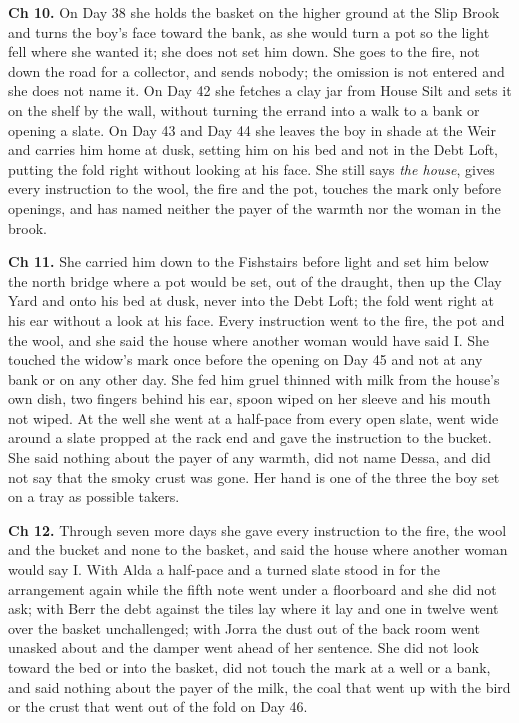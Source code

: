 \documentclass{design/chronicle}
\begin{document}
{\textbf{Ch 10.} On Day 38 she holds the basket on the higher ground at the Slip Brook and turns the boy’s face toward the bank, as she would turn a pot so the light fell where she wanted it; she does not set him down. She goes to the fire, not down the road for a collector, and sends nobody; the omission is not entered and she does not name it. On Day 42 she fetches a clay jar from House Silt and sets it on the shelf by the wall, without turning the errand into a walk to a bank or opening a slate. On Day 43 and Day 44 she leaves the boy in shade at the Weir and carries him home at dusk, setting him on his bed and not in the Debt Loft, putting the fold right without looking at his face. She still says \emph{the house}, gives every instruction to the wool, the fire and the pot, touches the mark only before openings, and has named neither the payer of the warmth nor the woman in the brook.

\textbf{Ch 11.} She carried him down to the Fishstairs before light and set him below the north bridge where a pot would be set, out of the draught, then up the Clay Yard and onto his bed at dusk, never into the Debt Loft; the fold went right at his ear without a look at his face. Every instruction went to the fire, the pot and the wool, and she said the house where another woman would have said I. She touched the widow’s mark once before the opening on Day 45 and not at any bank or on any other day. She fed him gruel thinned with milk from the house’s own dish, two fingers behind his ear, spoon wiped on her sleeve and his mouth not wiped. At the well she went at a half-pace from every open slate, went wide around a slate propped at the rack end and gave the instruction to the bucket. She said nothing about the payer of any warmth, did not name Dessa, and did not say that the smoky crust was gone. Her hand is one of the three the boy set on a tray as possible takers.

\textbf{Ch 12.} Through seven more days she gave every instruction to the fire, the wool and the bucket and none to the basket, and said the house where another woman would say I. With Alda a half-pace and a turned slate stood in for the arrangement again while the fifth note went under a floorboard and she did not ask; with Berr the debt against the tiles lay where it lay and one in twelve went over the basket unchallenged; with Jorra the dust out of the back room went unasked about and the damper went ahead of her sentence. She did not look toward the bed or into the basket, did not touch the mark at a well or a bank, and said nothing about the payer of the milk, the coal that went up with the bird or the crust that went out of the fold on Day 46.

}
\end{document}
